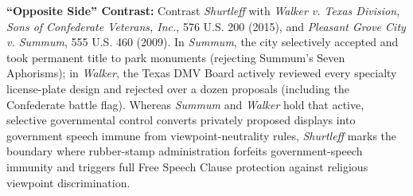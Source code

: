 \documentclass[12pt]{article}
\begin{document}
\textbf{``Opposite Side'' Contrast:} Contrast \textit{Shurtleff} with \textit{Walker v. Texas Division, Sons of Confederate Veterans, Inc.}, 576 U.S. 200 (2015), and \textit{Pleasant Grove City v. Summum}, 555 U.S. 460 (2009). In \textit{Summum}, the city selectively accepted and took permanent title to park monuments (rejecting Summum's Seven Aphorisms); in \textit{Walker}, the Texas DMV Board actively reviewed every specialty license-plate design and rejected over a dozen proposals (including the Confederate battle flag). Whereas \textit{Summum} and \textit{Walker} hold that active, selective governmental control converts privately proposed displays into government speech immune from viewpoint-neutrality rules, \textit{Shurtleff} marks the boundary where rubber-stamp administration forfeits government-speech immunity and triggers full Free Speech Clause protection against religious viewpoint discrimination.
\end{document}
